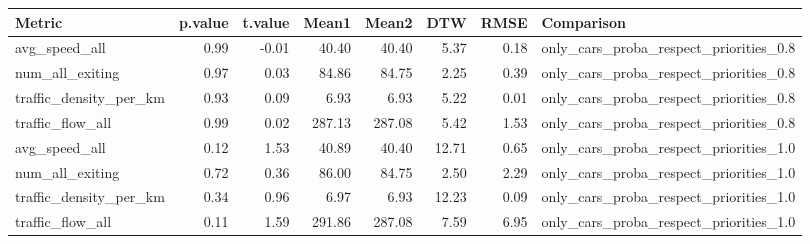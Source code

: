 \begin{table}[ht]
\centering
\begin{tabular}{lrrrrrrl}
  \hline
Metric & p.value & t.value & Mean1 & Mean2 & DTW & RMSE & Comparison \\ 
  \hline
avg\_speed\_all & 0.99 & -0.01 & 40.40 & 40.40 & 5.37 & 0.18 & only\_cars\_proba\_respect\_priorities\_0.8 \\ 
  num\_all\_exiting & 0.97 & 0.03 & 84.86 & 84.75 & 2.25 & 0.39 & only\_cars\_proba\_respect\_priorities\_0.8 \\ 
  traffic\_density\_per\_km & 0.93 & 0.09 & 6.93 & 6.93 & 5.22 & 0.01 & only\_cars\_proba\_respect\_priorities\_0.8 \\ 
  traffic\_flow\_all & 0.99 & 0.02 & 287.13 & 287.08 & 5.42 & 1.53 & only\_cars\_proba\_respect\_priorities\_0.8 \\ 
  avg\_speed\_all & 0.12 & 1.53 & 40.89 & 40.40 & 12.71 & 0.65 & only\_cars\_proba\_respect\_priorities\_1.0 \\ 
  num\_all\_exiting & 0.72 & 0.36 & 86.00 & 84.75 & 2.50 & 2.29 & only\_cars\_proba\_respect\_priorities\_1.0 \\ 
  traffic\_density\_per\_km & 0.34 & 0.96 & 6.97 & 6.93 & 12.23 & 0.09 & only\_cars\_proba\_respect\_priorities\_1.0 \\ 
  traffic\_flow\_all & 0.11 & 1.59 & 291.86 & 287.08 & 7.59 & 6.95 & only\_cars\_proba\_respect\_priorities\_1.0 \\ 
   \hline
\end{tabular}
\end{table}
